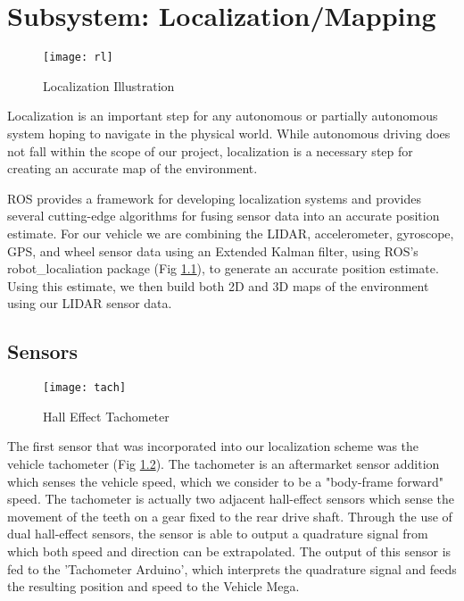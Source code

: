 \chapter{Subsystem: Localization/Mapping} \label{chap:Localization}


\begin{figure}[H]
	\centerline{\texttt{[image: rl]}}
	\caption[]{Localization Illustration \cite{clearpath}}
	\label{fig:robotlocalization}
\end{figure}

Localization is an important step for any autonomous or partially autonomous system hoping to navigate in the physical world. While autonomous driving does not fall within the scope of our project, localization is a necessary step for creating an accurate map of the environment. 

ROS provides a framework for developing localization systems and provides several cutting-edge algorithms for fusing sensor data into an accurate position estimate. For our vehicle we are combining the LIDAR, accelerometer, gyroscope, GPS, and wheel sensor data using an Extended Kalman filter, using ROS's robot\_localiation package (Fig \ref{fig:robotlocalization}), to generate an accurate position estimate. Using this estimate, we then build both 2D and 3D maps of the environment using our LIDAR sensor data. 

\section{Sensors}


\begin{figure}[H]
	\centerline{\texttt{[image: tach]}}
	\caption[]{Hall Effect Tachometer}
	\label{fig:tach}
\end{figure}

The first sensor that was incorporated into our localization scheme was the vehicle tachometer (Fig \ref{fig:tach}). The tachometer is an aftermarket sensor addition which senses the vehicle speed, which we consider to be a "body-frame forward" speed. The tachometer is actually two adjacent hall-effect sensors which sense the movement of the teeth on a gear fixed to the rear drive shaft. Through the use of dual hall-effect sensors, the sensor is able to output a quadrature signal from which both speed and direction can be extrapolated. The output of this sensor is fed to the 'Tachometer Arduino', which interprets the quadrature signal and feeds the resulting position and speed to the Vehicle Mega.

